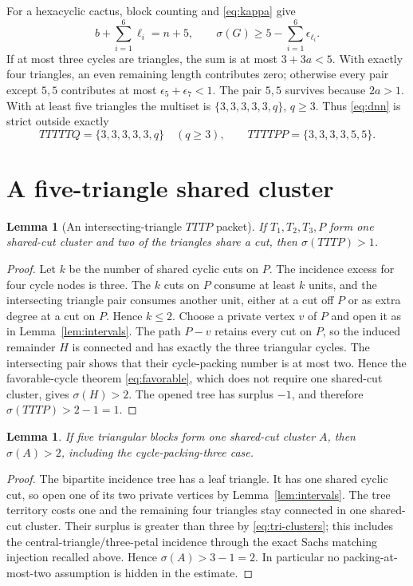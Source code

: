 \documentclass[11pt]{article}
\newtheorem{lemma}[theorem]{Lemma}
\newcommand{\sig}{\sigma}
\begin{document}
For a hexacyclic cactus, block counting and \eqref{eq:kappa} give
\[
 b+\sum_{i=1}^6\ell_i=n+5,
 \qquad
 \sig(G)\geq5-\sum_{i=1}^6\epsilon_{\ell_i}.
 \tag{3.1}\label{eq:dnn}
\]
If at most three cycles are triangles, the sum is at most
$3+3a<5$.  With exactly four triangles, an even remaining length contributes
zero; otherwise every pair except $5,5$ contributes at most
$\epsilon_5+\epsilon_7<1$.  The pair $5,5$ survives because $2a>1$.
With at least five triangles the multiset is $\{3,3,3,3,3,q\}$, $q\geq3$.
Thus \eqref{eq:dnn} is strict outside exactly
\begin{equation}\label{eq:residual}
 TTTTTQ=\{3,3,3,3,3,q\}\quad(q\geq3),
 \qquad TTTTPP=\{3,3,3,3,5,5\}.
\end{equation}

\section{A five-triangle shared cluster}

\begin{lemma}[An intersecting-triangle $TTTP$ packet]\label{lem:tttp-margin}
If $T_1,T_2,T_3,P$ form one shared-cut cluster and two of the triangles share
a cut, then $\sig(TTTP)>1$.
\end{lemma}

\begin{proof}
Let $k$ be the number of shared cyclic cuts on $P$.  The incidence excess for
four cycle nodes is three.  The $k$ cuts on $P$ consume at least $k$ units,
and the intersecting triangle pair consumes another unit, either at a cut off
$P$ or as extra degree at a cut on $P$.  Hence $k\leq2$.  Choose a private
vertex $v$ of $P$ and open it as in Lemma~\ref{lem:intervals}.  The path
$P-v$ retains every cut on $P$, so the induced remainder $H$ is connected and
has exactly the three triangular cycles.  The intersecting pair shows that
their cycle-packing number is at most two.  Hence the favorable-cycle theorem
\eqref{eq:favorable}, which does not require one shared-cut cluster, gives
$\sig(H)>2$.  The opened tree has surplus $-1$, and therefore
$\sig(TTTP)>2-1=1$.
\end{proof}

\begin{lemma}\label{lem:five-triangles}
If five triangular blocks form one shared-cut cluster $A$, then
$\sig(A)>2$, including the cycle-packing-three case.
\end{lemma}

\begin{proof}
The bipartite incidence tree has a leaf triangle.  It has one shared cyclic cut,
so open one of its two private vertices by Lemma~\ref{lem:intervals}.  The tree
territory costs one and the remaining four triangles stay connected in one
shared-cut cluster.  Their surplus is greater than three by
\eqref{eq:tri-clusters}; this includes the central-triangle/three-petal
incidence through the exact Sachs matching injection recalled above.  Hence
$\sig(A)>3-1=2$.  In particular no packing-at-most-two assumption is hidden in
the estimate.
\end{proof}
\end{document}
